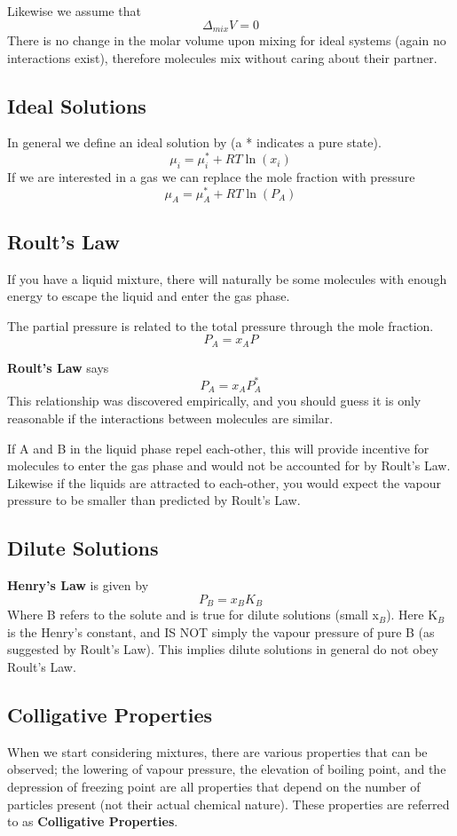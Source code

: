 \documentclass{article}
\newcommand{\be}{\begin{equation}}
\newcommand{\ee}{\end{equation}}
\begin{document}
Likewise we assume that 
\be
\Delta_{mix} V = 0
\ee
There is no change in the molar volume upon mixing for ideal systems (again no interactions exist), therefore molecules mix without caring about their partner. 

\subsection*{Ideal Solutions}
In general we define an ideal solution by (a * indicates a pure state).
\be
\mu_i = \mu_i^* + RT\ln(x_i)
\ee
If we are interested in a gas we can replace the mole fraction with pressure
\be
 \mu_A = \mu_A^* + RT\ln(P_A)
\ee

\subsection*{Roult's Law}
If you have a liquid mixture, there will naturally be some molecules with enough energy to escape the liquid and enter the gas phase. 

The partial pressure is related to the total pressure through the mole fraction.
\be
P_A = x_A P
\ee

\textbf{Roult's Law} says
\be
P_A = x_A P_A^*
\ee
This relationship was discovered empirically, and you should guess it is only reasonable if the interactions between molecules are similar. 

If A and B in the liquid phase repel each-other, this will provide incentive for molecules to enter the gas phase and would not be accounted for by Roult's Law.
Likewise if the liquids are attracted to each-other, you would expect the vapour pressure to be smaller than predicted by Roult's Law. 

\subsection*{Dilute Solutions}
\textbf{Henry's Law} is given by
\be
P_B = x_B K_B
\ee
Where B refers to the solute and is true for dilute solutions (small x$_B$). 
Here K$_B$ is the Henry's constant, and IS NOT simply the vapour pressure of pure B (as suggested by Roult's Law).
This implies dilute solutions in general do not obey Roult's Law.

\subsection*{Colligative Properties}
When we start considering mixtures, there are various properties that can be observed; the lowering of vapour pressure, the elevation of boiling point, and the depression of freezing point are all properties that depend on the number of particles present (not their actual chemical nature). 
These properties are referred to as \textbf{Colligative Properties}.
\end{document}
